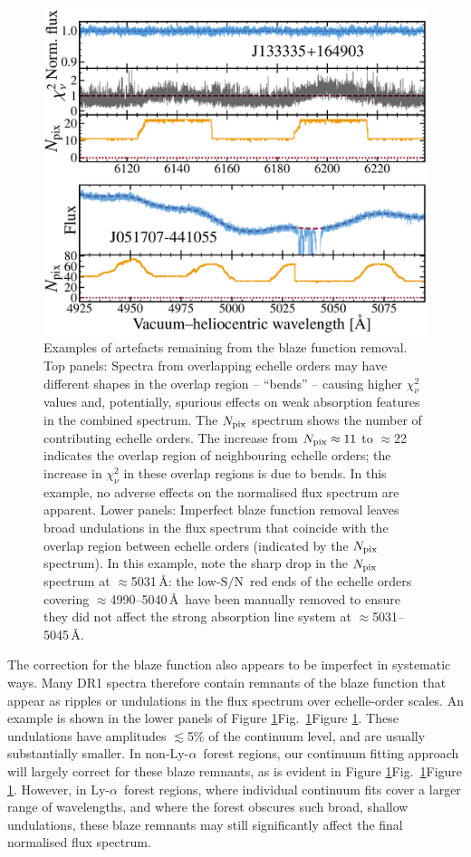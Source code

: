 \documentclass[fleqn,usenatbib,usedcolumn]{mnras}
\renewcommand{\la}{\lesssim} %
\newcommand{\Fref}[1]{\ifhmode \ifnum\spacefactor=1001 Figure \ref{#1}\else Fig.\ \ref{#1}\fi \else Figure \ref{#1}\fi}
\newcommand{\SN}{\ensuremath{\textrm{S/N}}}
\newcommand{\lya}{\ensuremath{\textrm{Ly-}\alpha}}
\begin{document}
\begin{figure}
\begin{center}
\includegraphics[width=0.90\columnwidth]{DR1_bends.pdf}
\vspace{-1em}
\caption{Examples of artefacts remaining from the blaze function removal. Top panels: Spectra from overlapping echelle orders may have different shapes in the overlap region -- ``bends'' -- causing higher $\chi^2_\nu$ values and, potentially, spurious effects on weak absorption features in the combined spectrum. The $N_{\rm pix}$ spectrum shows the number of contributing echelle orders. The increase from $N_{\rm pix}\approx11$ to $\approx$22 indicates the overlap region of neighbouring echelle orders; the increase in $\chi^2_\nu$ in these overlap regions is due to bends. In this example, no adverse effects on the normalised flux spectrum are apparent. Lower panels: Imperfect blaze function removal leaves broad undulations in the flux spectrum that coincide with the overlap region between echelle orders (indicated by the $N_{\rm pix}$ spectrum). In this example, note the sharp drop in the $N_{\rm pix}$ spectrum at $\approx$5031\,\AA: the low-\SN\ red ends of the echelle orders covering $\approx$4990--5040\,\AA\ have been manually removed to ensure they did not affect the strong absorption line system at $\approx$5031--5045\,\AA.}
\label{f:bends}
\end{center}
\end{figure}

The correction for the blaze function also appears to be imperfect in systematic ways. Many DR1 spectra therefore contain remnants of the blaze function that appear as ripples or undulations in the flux spectrum over echelle-order scales. An example is shown in the lower panels of \Fref{f:bends}. These undulations have amplitudes $\la$5\% of the continuum level, and are usually substantially smaller. In non-\lya\ forest regions, our continuum fitting approach will largely correct for these blaze remnants, as is evident in \Fref{f:bends}. However, in \lya\ forest regions, where individual continuum fits cover a larger range of wavelengths, and where the forest obscures such broad, shallow undulations, these blaze remnants may still significantly affect the final normalised flux spectrum.
\end{document}
